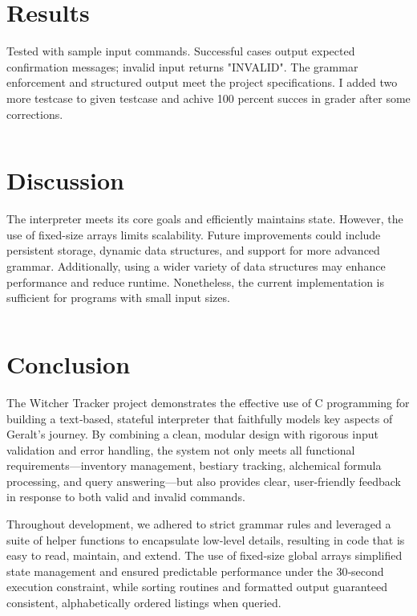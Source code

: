 \documentclass[12pt,a4paper]{article}
\begin{document}
\begin{verbatim}

\end{verbatim}

\section{Results}
Tested with sample input commands. Successful cases output expected confirmation messages; invalid input returns "INVALID". The grammar enforcement and structured output meet the project specifications. I added two more testcase to given testcase and achive 100 percent succes in grader after some corrections.

\begin{verbatim}

\end{verbatim}

\section{Discussion}
The interpreter meets its core goals and efficiently maintains state. However, the use of fixed-size arrays limits scalability. Future improvements could include persistent storage, dynamic data structures, and support for more advanced grammar. Additionally, using a wider variety of data structures may enhance performance and reduce runtime. Nonetheless, the current implementation is sufficient for programs with small input sizes.

\begin{verbatim}

\end{verbatim}

\section{Conclusion}
The Witcher Tracker project demonstrates the effective use of C programming for building a text‑based, stateful interpreter that faithfully models key aspects of Geralt’s journey. By combining a clean, modular design with rigorous input validation and error handling, the system not only meets all functional requirements—inventory management, bestiary tracking, alchemical formula processing, and query answering—but also provides clear, user‑friendly feedback in response to both valid and invalid commands.

Throughout development, we adhered to strict grammar rules and leveraged a suite of helper functions to encapsulate low‑level details, resulting in code that is easy to read, maintain, and extend. The use of fixed‑size global arrays simplified state management and ensured predictable performance under the 30‑second execution constraint, while sorting routines and formatted output guaranteed consistent, alphabetically ordered listings when queried.
\end{document}
